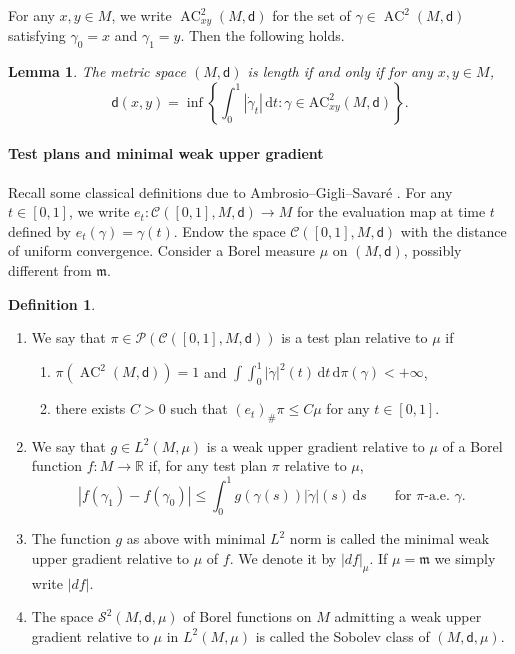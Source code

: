 \documentclass[10pt]{article}
\newcommand{\m}{\mathfrak{m}}
\renewcommand{\d}{\,\mathrm{d}}
\newcommand{\dist}{\mathsf{d}}
\DeclareMathOperator{\AC}{AC}
\theoremstyle{plain}
\newtheorem{lemma}[theorem]{Lemma}
\theoremstyle{definition}
\newtheorem{definition}[theorem]{Definition}
\newcommand{\accurves}{\AC^2(M,\dist)}
\newcommand{\accurvesxy}{\AC^2_{xy}(M,\dist)}
\begin{document}
For any $x, y \in M$, we write $\accurvesxy$ for the set of $\gamma \in \accurves$ satisfying $\gamma_0=x$ and $\gamma_1=y$. Then the following holds.

\begin{lemma}
    The metric space $(M,\dist)$ is length if and only if for any $x,y \in M$,
\[
\dist(x,y) = \inf \left\{\int_0^1 |\dot{\gamma}_t| \d t : \gamma \in \mathrm{AC}_{xy}^2(M,\dist)\right\}.
\]
\end{lemma}

\paragraph{Test plans and  minimal weak upper gradient} Recall some classical definitions due to Ambrosio--Gigli--Savaré \cite[Section 5.1]{AGSInv}. For any $t \in [0,1]$, we write $e_t : \mathcal{C}([0,1],M,\dist) \to M$ for the evaluation map at time $t$ defined by $e_t(\gamma)=\gamma(t)$. Endow the space $\mathcal{C}([0,1],M,\dist)$ with the distance of uniform convergence. Consider a Borel measure  $\mu$ on $(M,\dist)$, possibly different from $\m$. 

\begin{definition}
\begin{enumerate}
    \item We say that $\pi \in \mathcal{P}(\mathcal{C}([0,1],M,\dist))$ is a test plan relative to $\mu$ if
    \begin{enumerate}
        \item[(i)] $\pi(\accurves)=1$ and $\int \int_0^1 |\dot{\gamma}|^2(t) \d t \d \pi(\gamma) < +\infty$,
        \item[(ii)] there exists $C>0$ such that $(e_t)_\# \pi \le C \mu$ for any $t \in [0,1]$.
    \end{enumerate}

\item We say that $g \in L^2(M,\mu)$ is a weak upper gradient relative to $\mu$ of a Borel function $f:M \to \mathbb{R}$ if, for any test plan $\pi$ relative to $\mu$,
    \[
    |f(\gamma_1)- f(\gamma_0)| \le \int_0^1 g(\gamma(s)) |\dot{\gamma}|(s) \d s \qquad \text{for $\pi$-a.e.~$\gamma$.} 
    \]
    
\item The function $g$ as above with  minimal $L^2$ norm is called the minimal weak upper gradient relative to $\mu$ of $f$. We denote it by $|df|_\mu$.  If $\mu=\m$ we simply write $|df|$.

 \item The space $\mathcal{S}^2(M,\dist,\mu)$  of Borel functions on $M$ admitting a weak upper gradient relative to $\mu$ in $L^2(M,\mu)$ is called the Sobolev class of $(M,\dist,\mu)$.
 \end{enumerate}
\end{definition}
\end{document}
